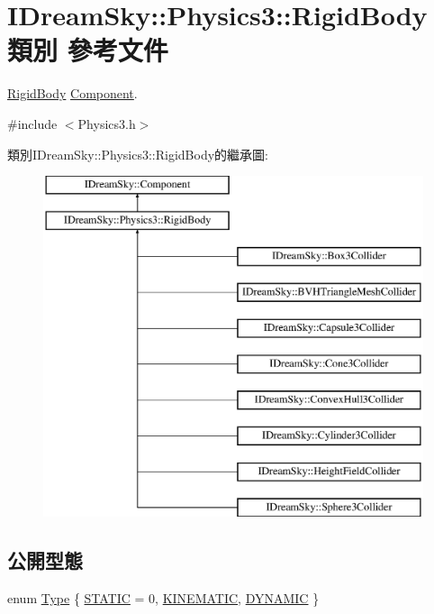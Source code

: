 \hypertarget{class_i_dream_sky_1_1_physics3_1_1_rigid_body}{}\section{I\+Dream\+Sky\+:\+:Physics3\+:\+:Rigid\+Body 類別 參考文件}
\label{class_i_dream_sky_1_1_physics3_1_1_rigid_body}


\hyperlink{class_i_dream_sky_1_1_physics3_1_1_rigid_body}{Rigid\+Body} \hyperlink{class_i_dream_sky_1_1_component}{Component}.  




{\ttfamily \#include $<$Physics3.\+h$>$}

類別\+I\+Dream\+Sky\+:\+:Physics3\+:\+:Rigid\+Body的繼承圖\+:\begin{figure}[H]
\begin{center}
\leavevmode
\includegraphics[height=10.000000cm]{class_i_dream_sky_1_1_physics3_1_1_rigid_body}
\end{center}
\end{figure}
\subsection*{公開型態}
\begin{DoxyCompactItemize}
\item 
enum \hyperlink{class_i_dream_sky_1_1_physics3_1_1_rigid_body_a8a970d66442558ce0a3ce7b8009c14fa}{Type} \{ \hyperlink{class_i_dream_sky_1_1_physics3_1_1_rigid_body_a8a970d66442558ce0a3ce7b8009c14faa82b6624dd8dbf02e84f646d105fdd0e3}{S\+T\+A\+T\+IC} = 0, 
\hyperlink{class_i_dream_sky_1_1_physics3_1_1_rigid_body_a8a970d66442558ce0a3ce7b8009c14faa6fe0113eab19e3d3334b51b7f5497102}{K\+I\+N\+E\+M\+A\+T\+IC}, 
\hyperlink{class_i_dream_sky_1_1_physics3_1_1_rigid_body_a8a970d66442558ce0a3ce7b8009c14faa0cfbb05a9c6a06aeb338eae6f86a3259}{D\+Y\+N\+A\+M\+IC}
 \}
\end{DoxyCompactItemize}
